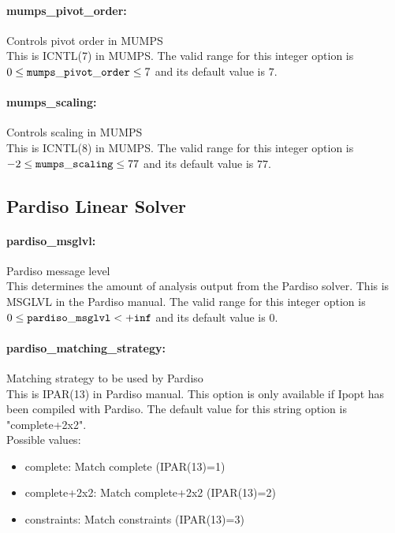 \paragraph{mumps\_pivot\_order:}\label{opt:mumps_pivot_order} Controls pivot order in MUMPS \\
 This is ICNTL(7) in MUMPS. The valid range for this integer option is
$0 \le {\tt mumps\_pivot\_order } \le 7$
and its default value is $7$.


\paragraph{mumps\_scaling:}\label{opt:mumps_scaling} Controls scaling in MUMPS \\
 This is ICNTL(8) in MUMPS. The valid range for this integer option is
$-2 \le {\tt mumps\_scaling } \le 77$
and its default value is $77$.


\subsection{Pardiso Linear Solver}

\paragraph{pardiso\_msglvl:}\label{opt:pardiso_msglvl} Pardiso message level \\
 This determines the amount of analysis output from the Pardiso solver. This is MSGLVL in the Pardiso manual. The valid range for this integer option is
$0 \le {\tt pardiso\_msglvl } <  {\tt +inf}$
and its default value is $0$.


\paragraph{pardiso\_matching\_strategy:}\label{opt:pardiso_matching_strategy} Matching strategy to be used by Pardiso \\
 This is IPAR(13) in Pardiso manual.  This option is only available if Ipopt has been compiled with Pardiso. The default value for this string option is "complete+2x2".
\\ 
Possible values:
\begin{itemize}
   \item complete: Match complete (IPAR(13)=1)
   \item complete+2x2: Match complete+2x2 (IPAR(13)=2)
   \item constraints: Match constraints (IPAR(13)=3)
\end{itemize}

